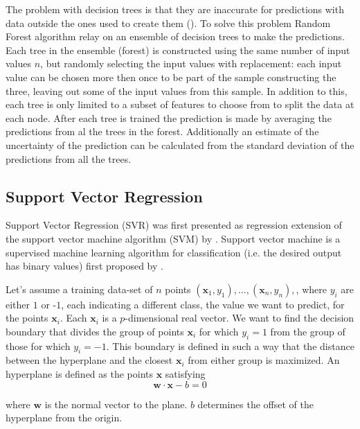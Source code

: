 The problem with decision trees is that they are inaccurate for predictions with data outside the ones used to create them (\cite{hastie01statisticallearning}).
To solve this problem Random Forest algorithm relay on an ensemble of decision trees to make the predictions. Each tree in the ensemble (forest) is constructed using the same number of input values $n$, but randomly selecting the input values with replacement: each input value can be chosen more then once to be part of the sample constructing the three, leaving out some of the input values from this sample. In addition to this, each tree is only limited to a subset of features to choose from to split the data at each node. After each tree is trained the prediction is made by averaging the predictions from al the trees in the forest. Additionally an estimate of the uncertainty of the prediction can be calculated from the standard deviation of the predictions from all the trees.



\subsection{Support Vector Regression}\label{svr}
Support Vector Regression (SVR) was first presented as regression extension of the support vector machine algorithm (SVM) by \citet{SVR1997}. Support vector machine is a supervised machine learning algorithm for classification (i.e. the desired output has binary values) first proposed by \citet{SVM1964}.

Let's assume a training data-set of $n$ points ${({\mathbf {x}}_{1},y_{1}),\ldots ,({\mathbf {x}}_{n},y_{n}),}$, where $y_{i}$ are either $1$ or -$1$, each indicating a different class, the value we want to predict, for the points ${\mathbf {x}}_{i}$. Each ${\mathbf {x}_{i}}$ is a $p$-dimensional real vector. We want to find the decision boundary that divides the group of points $\mathbf {x}_{i}$ for which $y_{i}=1$ from the group of those for which $y_{i}=-1$. This boundary is defined in such a way that the distance between the hyperplane and the closest ${\mathbf {x}}_{i}$ from either group is maximized.
An hyperplane is defined as the points ${\mathbf {x}}$ satisfying 
\begin{equation}\label{eq:svm}
\mathbf {w}\cdot \mathbf {x}-b=0
\end{equation}

where $\mathbf {w}$ is the normal vector to the plane. $b$ determines the offset of the hyperplane from the origin.

